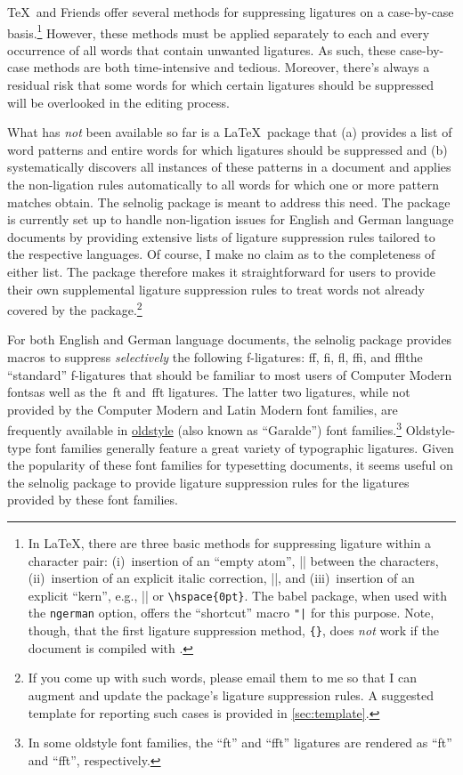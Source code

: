 \documentclass[11pt]{article}
\newcommand{\pkg}[1]{\textsf{#1}}
\newcommand{\opt}[1]{\texttt{#1}}
\begin{document}
\TeX\ and Friends offer several methods for suppressing ligatures on a case-by-case basis.\footnote{In \LaTeX, there are three basic methods for suppressing ligature within a character pair: (i)~insertion of an \enquote{empty atom}, |{}| between the characters, (ii)~insertion of an explicit italic correction, |\/|, and (iii)~insertion of an explicit \enquote{kern}, e.g., |\kern0pt| or \Verb/\hspace{0pt}/. The \pkg{babel} package, when used with the \opt{ngerman} option, offers the \enquote{shortcut} macro \Verb/"|/ for this purpose. Note, though, that the first ligature suppression method, \Verb/{}/, does \emph{not} work if the document is compiled with \LuaLaTeX.} However, these methods must be applied separately to each and every occurrence of all words that contain unwanted ligatures. As such, these case-by-case methods are both time-intensive and tedious. Moreover, there's always a residual risk that some words for which certain ligatures should be suppressed will be overlooked in the editing process. 

What has \emph{not} been available so far is a \LaTeX\ package that (a) provides a list of word patterns and entire words for which ligatures should be suppressed and (b) systematically discovers all instances of these patterns in a document and applies the non-ligation rules automatically to all words for which one or more pattern matches obtain. The \pkg{selnolig} package is meant to address this need. The package is currently set up to handle non-ligation issues for English and German language documents by providing extensive lists of ligature suppression rules tailored to the respective languages. Of course, I make no claim as to the completeness of either list. The package therefore makes it straightforward for users to provide their own supplemental ligature suppression rules to treat words not already covered by the package.\footnote{If you come up with such words, please email them to me so that I can augment and update the package's ligature suppression rules. A suggested template for reporting such cases is provided in \cref{sec:template}.} 

For both English and German language documents, the \pkg{selnolig} package provides macros to suppress \emph{selectively} the following f-ligatures: ff, fi, fl, ffi, and ffl\textemdash the \enquote{standard} f-ligatures that should be familiar to most users of Computer Modern fonts\textemdash as well as the~ft and~fft ligatures. The latter two ligatures, while not provided by the Computer Modern and Latin Modern font families, are frequently available in \href{http://en.wikipedia.org/wiki/Serif#Old_Style}{oldstyle} (also known as \enquote{Garalde}) font families.\footnote{In some oldstyle font families, the \enquote{ft} and \enquote{fft} ligatures are rendered as \enquote{\sabon ft} and \enquote{\sabon fft}, respectively.} Oldstyle-type font families generally feature a great variety of typographic ligatures. Given the popularity of these font families for typesetting documents, it seems useful on the \pkg{selnolig} package to provide ligature suppression rules for the ligatures provided by these font families.
\end{document}
